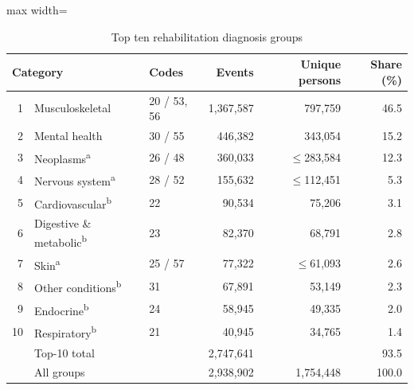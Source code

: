\documentclass[a4paper,12pt]{article}
\theoremstyle{plain}
\theoremstyle{definition}
\theoremstyle{TheoremNum}
\theoremstyle{CorollaryNum}
\theoremstyle{PropositionNum}
\theoremstyle{TheoremNum}
\begin{document}

\begin{table}[H]
\centering
\begin{adjustbox}{max width=\textwidth}
\begin{tabular}{rllrrr}
\toprule
\multicolumn{2}{l}{Category} & Codes & Events & Unique persons & Share (\%) \\
\midrule
1  & Musculoskeletal    & 20 / 53, 56 & 1,367,587 & 797,759       & 46.5 \\
2  & Mental health      & 30 / 55     & 446,382   & 343,054       & 15.2 \\
3  & Neoplasms\textsuperscript{a}          & 26 / 48     & 360,033   & $\leq$283,584 & 12.3 \\
4  & Nervous system\textsuperscript{a}     & 28 / 52     & 155,632   & $\leq$112,451 & 5.3  \\
5  & Cardiovascular\textsuperscript{b}     & 22          & 90,534    & 75,206        & 3.1  \\
6  & Digestive \& metabolic\textsuperscript{b} & 23      & 82,370    & 68,791        & 2.8  \\
7  & Skin\textsuperscript{a}               & 25 / 57     & 77,322    & $\leq$61,093  & 2.6  \\
8  & Other conditions\textsuperscript{b}   & 31          & 67,891    & 53,149        & 2.3  \\
9  & Endocrine\textsuperscript{b}          & 24          & 58,945    & 49,335        & 2.0  \\
10 & Respiratory\textsuperscript{b}        & 21          & 40,945    & 34,765        & 1.4  \\
\midrule
   & Top-10 total & & 2,747,641 &           & 93.5  \\
   & All groups   & & 2,938,902 & 1,754,448 & 100.0 \\
\bottomrule
\end{tabular}
\end{adjustbox}
\caption{Top ten rehabilitation diagnosis groups}
\label{tab:rehabilitation_diagnosis_groups}


\end{table}
\end{document}
